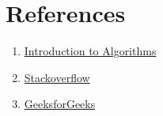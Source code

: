 \documentclass[conference]{IEEEtran}
\begin{document}
\section{\textbf {References}} 

\begin{enumerate}

\item  \href{https://edutechlearners.com/download/Introduction_to_algorithms-3rd%20Edition.pdf}{Introduction to Algorithms}\\
    
\item  \href{https://stackoverflow.com/questions/49436211/longest-common-prefix-divide-and-conquer-approach-complexity-analysis}{
Stackoverflow}
\\
\item  \href{https://www.geeksforgeeks.org/longest-common-prefix-using-divide-and-conquer-algorithm}{GeeksforGeeks}

\end{enumerate}
\end{document}
